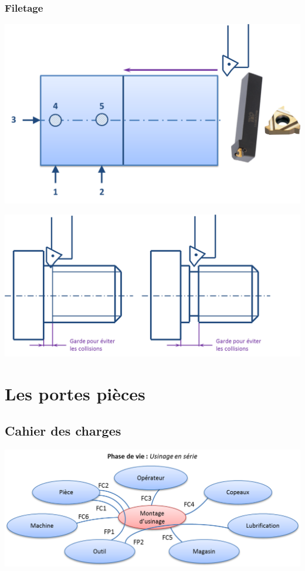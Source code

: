 \documentclass[11pt,oneside]{article}
\begin{document}
\subsubsection{Filetage}
\begin{center}
\includegraphics[width=.7\textwidth]{png/op_filetage}
\end{center}

\begin{center}
\includegraphics[width=.7\textwidth]{png/op_filetage2}
\end{center}



\section{Les portes pièces}
\subsection{Cahier des charges}

\begin{center}
\includegraphics[width=.95\textwidth]{png/af1}
\end{center}
\end{document}
